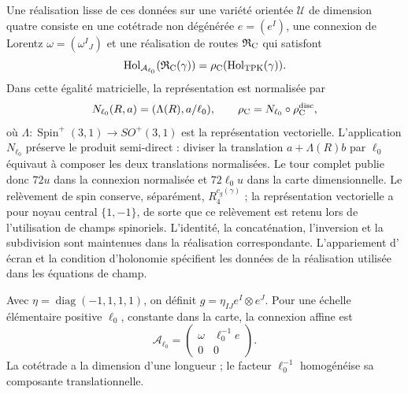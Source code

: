 Une réalisation lisse de ces données sur une variété orientée \(\mathcal U\) de dimension quatre consiste en une cotétrade non dégénérée \(e=(e^I)\), une connexion de Lorentz \(\omega=(\omega^I{}_J)\) et une réalisation de routes \(\mathfrak R_{\rm C}\) qui satisfont
\begin{equation}
 \operatorname{Hol}_{\mathcal A_{\ell_0}}
       (\mathfrak R_{\rm C}(\gamma))
 =\rho_{\rm C}(\operatorname{Hol}_{\rm TPK}(\gamma)).
 \label{ii:vii:eq:compatibilidad-holonomia-geometrica}
\end{equation}
Dans cette égalité matricielle, la représentation est normalisée par
\[
 N_{\ell_0}(R,a)=(\Lambda(R),a/\ell_0),\qquad
 \rho_{\rm C}=N_{\ell_0}\circ\rho_{\rm C}^{\rm disc},
\]
où \(\Lambda:\operatorname{Spin}^+(3,1)\to SO^+(3,1)\)
est la représentation vectorielle. L'application \(N_{\ell_0}\)
préserve le produit semi-direct : diviser la translation
\(a+\Lambda(R)b\) par \(\ell_0\) équivaut à composer les
deux translations normalisées. Le tour complet publie donc
\(72u\) dans la connexion normalisée et \(72\ell_0u\) dans la
carte dimensionnelle. Le relèvement de spin conserve, séparément,
\(R_4^{c_g(\gamma)}\) ; la représentation vectorielle a pour
noyau central \(\{1,-1\}\), de sorte que ce
relèvement est retenu lors de l'utilisation de champs spinoriels.
L'identité, la concaténation, l'inversion et la subdivision sont maintenues dans la
réalisation correspondante. L'appariement d'
écran et la condition d'holonomie spécifient les données de la
réalisation utilisée dans les équations de champ.

Avec \(\eta=\operatorname{diag}(-1,1,1,1)\), on définit
\(g=\eta_{IJ}e^I\otimes e^J\). Pour une échelle élémentaire
positive \(\ell_0\), constante dans la carte, la connexion affine est
\begin{equation}
 \mathcal A_{\ell_0}
 =\begin{pmatrix}\omega&\ell_0^{-1}e\\0&0\end{pmatrix}.
 \label{ii:vii:eq:conexion-afin-realizada}
\end{equation}
La cotétrade a la dimension d'une longueur ; le facteur \(\ell_0^{-1}\) homogénéise sa composante translationnelle.

